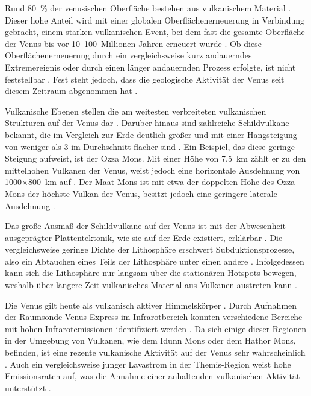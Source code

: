 \documentclass[a4paper,11pt]{article}
\begin{document}
Rund 80~\% der venusischen Oberfläche bestehen aus vulkanischem Material \parencite[67]{Ivanov_2013}.
Dieser hohe Anteil wird mit einer globalen Oberflächenerneuerung in Verbindung gebracht, einem starken vulkanischen Event,
bei dem fast die gesamte Oberfläche der Venus bis vor 10--100~Millionen Jahren erneuert wurde \parencite[40, 42]{Nimmo_1998}.
Ob diese Oberflächenerneuerung durch ein vergleichsweise kurz andauerndes Extremereignis oder
durch einen länger andauernden Prozess erfolgte, ist nicht feststellbar \parencite[40]{Nimmo_1998}.
Fest steht jedoch, dass die geologische Aktivität der Venus seit diesem Zeitraum abgenommen hat \parencite[40]{Nimmo_1998}.

Vulkanische Ebenen stellen die am weitesten verbreiteten vulkanischen Strukturen auf der Venus dar \parencite[68]{Ivanov_2013}.
Darüber hinaus sind zahlreiche Schildvulkane bekannt, die im Vergleich zur Erde deutlich größer und
mit einer Hangsteigung von weniger als 3\degree{} im Durchschnitt flacher sind \parencite[2~f.]{Mason_2025}.
Ein Beispiel, das diese geringe Steigung aufweist, ist der Ozza Mons.
Mit einer Höhe von 7,5~km zählt er zu den mittelhohen Vulkanen der Venus,
weist jedoch eine horizontale Ausdehnung von 1000$\times$800~km auf \parencite[12]{Mason_2025}.
Der Maat Mons ist mit etwa der doppelten Höhe des Ozza Mons der höchste Vulkan der Venus,
besitzt jedoch eine geringere laterale Ausdehnung \parencite[13]{Mason_2025}.

Das große Ausmaß der Schildvulkane auf der Venus ist mit der Abwesenheit ausgeprägter Plattentektonik,
wie sie auf der Erde existiert, erklärbar \parencite[2]{Mason_2025}.
Die vergleichsweise geringe Dichte der Lithosphäre erschwert Subduktionsprozesse,
also ein Abtauchen eines Teils der Lithosphäre unter einen andere \parencite[40]{Nimmo_1998}.
Infolgedessen kann sich die Lithosphäre nur langsam über die stationären Hotspots bewegen,
weshalb über längere Zeit vulkanisches Material aus Vulkanen austreten kann \parencites[17]{Mason_2025}[39]{Nimmo_1998}.

Die Venus gilt heute als vulkanisch aktiver Himmelskörper \parencite[607]{Smrekar_2010}.
Durch Aufnahmen der Raumsonde Venus Express im Infrarotbereich konnten verschiedene Bereiche mit hohen
Infrarotemissionen identifiziert werden \parencite[605, 606]{Smrekar_2010}.
Da sich einige dieser Regionen in der Umgebung von Vulkanen,
wie dem Idunn Mons oder dem Hathor Mons, befinden,
ist eine rezente vulkanische Aktivität auf der Venus sehr wahrscheinlich \parencite[606]{Smrekar_2010}.
Auch ein vergleichsweise junger Lavastrom in der Themis-Region weist hohe Emissionsraten auf,
was die Annahme einer anhaltenden vulkanischen Aktivität unterstützt \parencite[606]{Smrekar_2010}.
\end{document}
